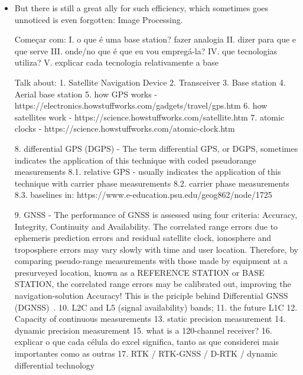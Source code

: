 \begin{itemize}
    \item 
    But there is still a great ally for such efficiency, which sometimes goes unnoticed is even forgotten: Image Processing.

    Começar com:
    I. o que é uma base station? fazer analogia
    II. dizer para que e que serve
    III. onde/no que é que eu vou empregá-la?
    IV. que tecnologias utiliza?
    V. explicar cada tecnologia relativamente a base

    Talk about:
        1. Satellite Navigation Device
        2. Transceiver
        3. Base station
        4. Aerial base station
        5. how GPS works - https://electronics.howstuffworks.com/gadgets/travel/gps.htm
        6. how satellites work - https://science.howstuffworks.com/satellite.htm
        7. atomic clocks - https://science.howstuffworks.com/atomic-clock.htm

        8. differential GPS (DGPS) - The term differential GPS, or DGPS, sometimes indicates the application of this technique with coded pseudorange measurements
        8.1. relative GPS - usually indicates the application of this technique with carrier phase measurements
        8.2. carrier phase measurements
        8.3. baselines
        in: https://www.e-education.psu.edu/geog862/node/1725

        9. GNSS - The performance of GNSS is assessed using four criteria: Accuracy, Integrity, Continuity and Availability. The correlated range errors due to ephemeris prediction errors and residual satellite clock, ionosphere and troposphere errors may vary slowly with time and user location.
        Therefore, by comparing pseudo-range measurements with those made by equipment at a presurveyed location, known as a REFERENCE STATION or BASE STATION, the correlated range errors may be calibrated out, improving the navigation-solution Accuracy! This is the priciple behind Differential GNSS (DGNSS)~\cite{edseee_9101092}. %
        10. L2C and L5 (signal availability) bands;
        11. the future L1C
        12. Capacity of continuous measurements
        13. static precision measurement
        14. dynamic precision measurement
        15. what is a 120-channel receiver?
        16. explicar o que cada célula do excel significa, tanto as que considerei mais importantes como as outras
        17. RTK / RTK-GNSS / D-RTK / dynamic differential technology~\cite{ayers_geosystems_2011}
        

\end{itemize}
